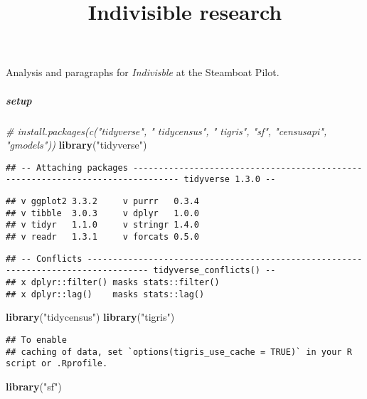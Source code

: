 \documentclass[]{article}
\title{Indivisible research}
\author{}
\date{\vspace{-2.5em}}
\newenvironment{Shaded}{\begin{snugshade}}{\end{snugshade}}
\newcommand{\CommentTok}[1]{\textcolor[rgb]{0.56,0.35,0.01}{\textit{#1}}}
\newcommand{\KeywordTok}[1]{\textcolor[rgb]{0.13,0.29,0.53}{\textbf{#1}}}
\newcommand{\NormalTok}[1]{#1}
\newcommand{\StringTok}[1]{\textcolor[rgb]{0.31,0.60,0.02}{#1}}
\let\oldsubparagraph\subparagraph
\renewcommand{\subparagraph}[1]{\oldsubparagraph{#1}\mbox{}}
\begin{document}
\maketitle

Analysis and paragraphs for \emph{Indivisble} at the Steamboat Pilot.

\hypertarget{setup}{%
\subparagraph{setup}\label{setup}}

\begin{Shaded}
\begin{Highlighting}[]
\CommentTok{# install.packages(c("tidyverse", " tidycensus", " tigris", "sf", "censusapi", "gmodels"))}
\KeywordTok{library}\NormalTok{(}\StringTok{"tidyverse"}\NormalTok{)}
\end{Highlighting}
\end{Shaded}

\begin{verbatim}
## -- Attaching packages ------------------------------------------------------------------------------- tidyverse 1.3.0 --
\end{verbatim}

\begin{verbatim}
## v ggplot2 3.3.2     v purrr   0.3.4
## v tibble  3.0.3     v dplyr   1.0.0
## v tidyr   1.1.0     v stringr 1.4.0
## v readr   1.3.1     v forcats 0.5.0
\end{verbatim}

\begin{verbatim}
## -- Conflicts ---------------------------------------------------------------------------------- tidyverse_conflicts() --
## x dplyr::filter() masks stats::filter()
## x dplyr::lag()    masks stats::lag()
\end{verbatim}

\begin{Shaded}
\begin{Highlighting}[]
\KeywordTok{library}\NormalTok{(}\StringTok{"tidycensus"}\NormalTok{)}
\KeywordTok{library}\NormalTok{(}\StringTok{"tigris"}\NormalTok{)}
\end{Highlighting}
\end{Shaded}

\begin{verbatim}
## To enable 
## caching of data, set `options(tigris_use_cache = TRUE)` in your R script or .Rprofile.
\end{verbatim}

\begin{Shaded}
\begin{Highlighting}[]
\KeywordTok{library}\NormalTok{(}\StringTok{"sf"}\NormalTok{)}
\end{Highlighting}
\end{Shaded}
\end{document}

